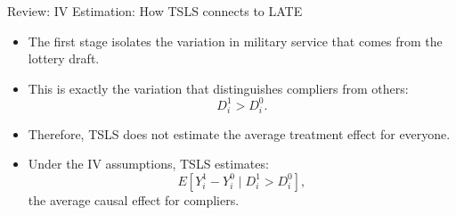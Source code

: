 \documentclass[dvipsnames,hyperref={pdfpagelabels=false}]{beamer}
\begin{document}
\begin{frame}{Review: IV Estimation: How TSLS connects to LATE}
	\begin{itemize}
		\item The first stage isolates the variation in military service that comes from the lottery draft.
		\vspace{0.2cm}

		\item This is exactly the variation that distinguishes compliers from others:
		\[
		D_i^1 > D_i^0.
		\]

		\vspace{0.2cm}

		\item Therefore, TSLS does not estimate the average treatment effect for everyone.
		\vspace{0.2cm}

		\item Under the IV assumptions, TSLS estimates:
		\[
		E[Y_i^1-Y_i^0 \mid D_i^1>D_i^0],
		\]
		the average causal effect for compliers.

		\vspace{0.2cm}

	\end{itemize}
\end{frame}






\end{document}
